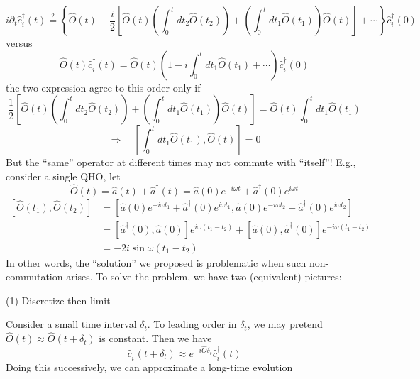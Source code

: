 \[i\partial _t\hat{c}_{i}^{\dagger}\left( t \right) \stackrel{?}{=}\left\{ \hat{O}\left( t \right) -\frac{i}{2}\left[ \hat{O}\left( t \right) \left( \int_0^t{dt_2\hat{O}\left( t_2 \right)} \right) +\left( \int_0^t{dt_1\hat{O}\left( t_1 \right)} \right) \hat{O}\left( t \right) \right] +\cdots \right\} \hat{c}_{i}^{\dagger}\left( 0 \right) \]
versus
\[ \hat{O}\left( t \right) \hat{c}_{i}^{\dagger}\left( t \right) =\hat{O}\left( t \right) \left( 1-i\int_0^t{dt_1\hat{O}\left( t_1 \right)}+\cdots \right) \hat{c}_{i}^{\dagger}\left( 0 \right) \]
the two expression agree to this order only if
\[ \frac{1}{2}\left[ \hat{O}\left( t \right) \left( \int_0^t{dt_2\hat{O}\left( t_2 \right)} \right) +\left( \int_0^t{dt_1\hat{O}\left( t_1 \right)} \right) \hat{O}\left( t \right) \right] =\hat{O}\left( t \right) \int_0^t{dt_1\hat{O}\left( t_1 \right)}\]
\[ \Rightarrow \quad \left[ \int_0^t{dt_1\hat{O}\left( t_1 \right)},\hat{O}\left( t \right) \right] =0\]
But the ``same'' operator at different times may not commute with ``itself''! E.g., consider a single QHO, let
\[ \hat{O}\left( t \right) =\hat{a}\left( t \right) +\hat{a}^{\dagger}\left( t \right) =\hat{a}\left( 0 \right) e^{-i\omega t}+\hat{a}^{\dagger}\left( 0 \right) e^{i\omega t}\]
\begin{align*}
    \left[ \hat{O}\left( t_1 \right) ,\hat{O}\left( t_2 \right) \right] &=\left[ \hat{a}\left( 0 \right) e^{-i\omega t_1}+\hat{a}^{\dagger}\left( 0 \right) e^{i\omega t_1},\hat{a}\left( 0 \right) e^{-i\omega t_2}+\hat{a}^{\dagger}\left( 0 \right) e^{i\omega t_2} \right] \\
    &=\left[ \hat{a}^{\dagger}\left( 0 \right) ,\hat{a}\left( 0 \right) \right] e^{i\omega \left( t_1-t_2 \right)}+\left[ \hat{a}\left( 0 \right) ,\hat{a}^{\dagger}\left( 0 \right) \right] e^{-i\omega \left( t_1-t_2 \right)}\\
    &=-2i\sin \omega \left( t_1-t_2 \right)
\end{align*}
In other words, the ``solution'' we proposed is problematic when such non-commutation arises. To solve the problem, we have two (equivalent) pictures:

(1) Discretize then limit

Consider a small time interval $\delta_t$. To leading order in $\delta_t$, we may pretend $\hat{O}(t)\approx \hat{O}(t+\delta_t)$ is constant. Then we have
\[ \hat{c}_{i}^{\dagger}\left( t+\delta _t \right) \approx e^{-i\hat{O}\delta _t}\hat{c}_{i}^{\dagger}\left( t \right) \]
Doing this successively, we can approximate a long-time evolution

